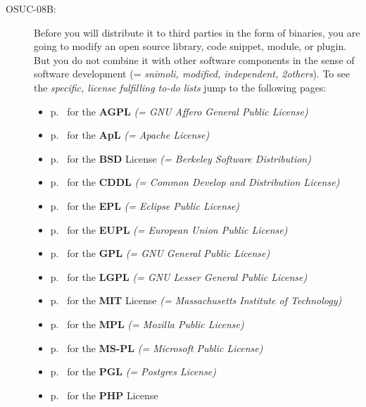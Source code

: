 \begin{description}
\item[OSUC-08B:]\label{OSUC-08B-DEF} Before you will distribute it to third
parties in the form of binaries, you are going to modify an open source library,
code snippet, module, or plugin. But you do not combine it with other software
components in the sense of software development (= \textit{snimoli, modified,
independent, 2others}). To see the \textit{specific, license fulfilling to-do
lists} jump to the following pages:
  \begin{itemize}
    \item p.\ \pageref{OSUC-08B-AGPL} for the \textbf{AGPL}
      \textit{(= GNU Affero General Public License)} 
    \item p.\ \pageref{OSUC-08B-Apache20} for the \textbf{ApL}
      \textit{(= Apache License)}
    \item p.\ \pageref{OSUC-08B-BSD} for the \textbf{BSD} License
      \textit{(= Berkeley Software Distribution)}
    \item p.\ \pageref{OSUC-08B-CDDL} for the \textbf{CDDL}
      \textit{(= Common Develop and Distribution License)}  
    \item p.\ \pageref{OSUC-08B-EPL} for the \textbf{EPL}
      \textit{(= Eclipse Public License)}     
    \item p.\ \pageref{OSUC-08B-EUPL} for the \textbf{EUPL}
      \textit{(= European Union Public License)} 
    \item p.\ \pageref{OSUC-08B-GPL} for the \textbf{GPL}
       \textit{(= GNU General Public License)} 
    \item p.\ \pageref{OSUC-08B-LGPL} for the \textbf{LGPL}
      \textit{(= GNU Lesser General Public License)}           
    \item p.\ \pageref{OSUC-08B-MIT} for the \textbf{MIT} License
       \textit{(= Massachusetts Institute of Technology)} 
    \item p.\ \pageref{OSUC-08B-MPL} for the \textbf{MPL}
      \textit{(= Mozilla Public License)}     
    \item p.\ \pageref{OSUC-08B-MS-PL} for the \textbf{MS-PL}
      \textit{(= Microsoft Public License)} 
    \item p.\ \pageref{OSUC-08B-PGL} for the \textbf{PGL}
      \textit{(= Postgres License)} 
    \item p.\ \pageref{OSUC-08B-PHP} for the \textbf{PHP} License 
  \end{itemize}


\end{description}
